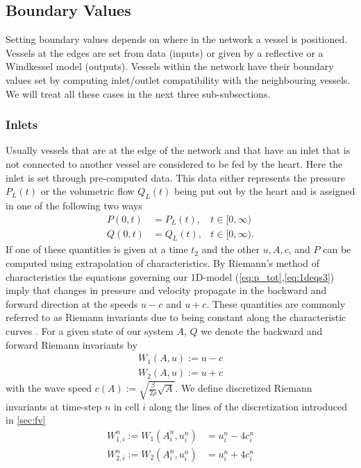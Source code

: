 \documentclass[a4paper, oneside]{discothesis}
\begin{document}
	\subsection{Boundary Values} \label{ssec:boundary_values}
	Setting boundary values depends on where in the network a vessel is positioned.
	Vessels at the edges are set from data (inputs) or given by a reflective or a Windkessel model (outputs).
	Vessels within the network have their boundary values set by computing inlet/outlet compatibility with the neighbouring vessels.
	We will treat all these cases in the next three sub-subsections.

	\subsubsection{Inlets}\label{sssec:inlets}
	Usually vessels that are at the edge of the network and that have an inlet that is not connected to another vessel are considered to be fed by the heart.
	Here the inlet is set through pre-computed data.
	This data either represents the pressure $P_L(t)$ or the volumetric flow $Q_L(t)$ being put out by the heart and is assigned in one of the following two ways
	\begin{align}
		P(0,t) &= P_L(t), &t \in [0,\infty) \\
		Q(0,t) &= Q_L(t), &t \in [0,\infty).
	\end{align}
	If one of these quantities is given at a time $t_2$ and the other $u, A, c$, and $P$ can be computed using extrapolation of characteristics.
	By Riemann's method of characteristics\cite{riemann1860fortpflanzung} the equations governing our 1D-model (\ref{eq:p_tot},\ref{eq:1deqs3}) imply that changes in pressure and velocity propagate in the backward and forward direction at the speeds $u-c$ and $u+c$.
	These quantities are commonly referred to as Riemann invariants due to being constant along the characteristic curves \cite{sarra2003method}.
	For a given state of our system $A$, $Q$ we denote the backward and forward Riemann invariants by
	\begin{align}
		W_1(A,u) := u - c \\
		W_2(A,u) := u + c
	\end{align}
	with the wave speed $c(A) := \sqrt{\frac{\beta}{2\rho}\sqrt{A}}$.
	We define discretized Riemann invariants at time-step $n$ in cell $i$ along the lines of the discretization introduced in \autoref{sec:fv}
	\begin{align}
		W_{1,i}^n := W_1(A_i^n,u_i^n) &= u^n_i - 4c^n_i\\
		W_{2,i}^n := W_2(A_i^n,u_i^n) &= u^n_i + 4c^n_i
	\end{align}
\end{document}
